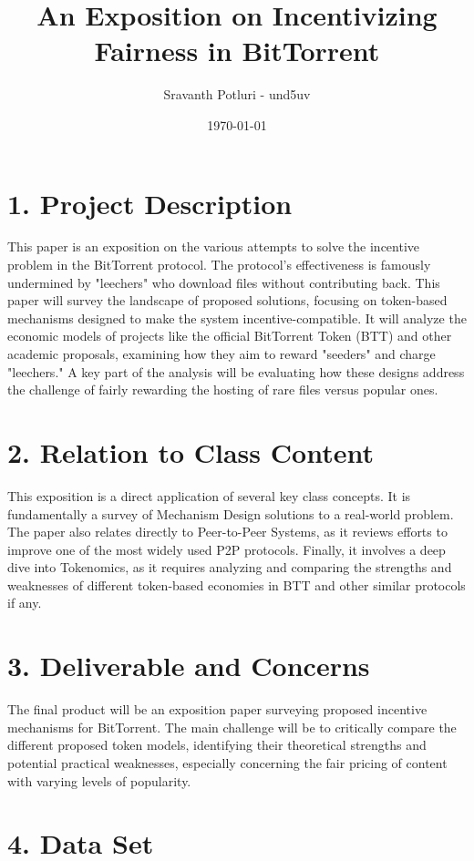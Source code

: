 \documentclass[12pt]{article}
\title{An Exposition on Incentivizing Fairness in BitTorrent}
\author{Sravanth Potluri - und5uv}
\date{\today}
\theoremstyle{definition}
\begin{document}
\maketitle

\section*{1. Project Description}

This paper is an exposition on the various attempts to solve the incentive problem in the BitTorrent protocol. The protocol's effectiveness is famously undermined by "leechers" who download files without contributing back. This paper will survey the landscape of proposed solutions, focusing on token-based mechanisms designed to make the system incentive-compatible. It will analyze the economic models of projects like the official BitTorrent Token (BTT) and other academic proposals, examining how they aim to reward "seeders" and charge "leechers." A key part of the analysis will be evaluating how these designs address the challenge of fairly rewarding the hosting of rare files versus popular ones.

\section*{2. Relation to Class Content}

This exposition is a direct application of several key class concepts. It is fundamentally a survey of Mechanism Design solutions to a real-world problem. The paper also relates directly to Peer-to-Peer Systems, as it reviews efforts to improve one of the most widely used P2P protocols. Finally, it involves a deep dive into Tokenomics, as it requires analyzing and comparing the strengths and weaknesses of different token-based economies in BTT and other similar protocols if any.

\section*{3. Deliverable and Concerns}

The final product will be an exposition paper surveying proposed incentive mechanisms for BitTorrent. The main challenge will be to critically compare the different proposed token models, identifying their theoretical strengths and potential practical weaknesses, especially concerning the fair pricing of content with varying levels of popularity.

\section*{4. Data Set}
\end{document}
